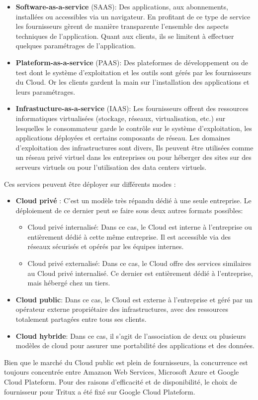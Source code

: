 \begin{itemize}
	\item   \textbf{Software-as-a-service} (SAAS): Des applications, aux abonnements, installées ou accessibles via un navigateur. En profitant de ce type de service les fournisseurs gèrent de manière transparente l'ensemble des aspects techniques de l'application. Quant aux clients, ils se limitent à effectuer quelques paramétrages de l'application. 
	\item \textbf{Plateform-as-a-service} (PAAS): Des plateformes de développement ou de test dont le système d'exploitation et les outils sont gérés par les fournisseurs du Cloud. Or les clients gardent la main sur l'installation des applications et leurs paramétrages.
	\item   \textbf{Infrastucture-as-a-service} (IAAS): Les fournisseurs offrent des ressources informatiques  virtualisées (stockage, réseaux, virtualisation, etc.) sur lesquelles le consommateur garde le contrôle sur le système d'exploitation, les applications déployées  et certains composants de réseau. 	Les domaines d'exploitation des infrastructures sont divers, Ils peuvent être  utilisées  comme un réseau privé virtuel dans les entreprises ou pour héberger des sites sur des serveurs virtuels ou pour l'utilisation des data centers virtuels. 
	
\end{itemize}
Ces services peuvent être déployer sur différents modes : \begin{itemize}
	\item \textbf{Cloud privé} : C'est un modèle très répandu dédié à une seule entreprise. Le déploiement de ce dernier peut se faire sous deux autres formats possibles:
	\begin{itemize}
		\item {Cloud privé internalisé}: Dans ce cas, le Cloud est interne à l'entreprise ou entièrement dédié à cette même entreprise. Il est accessible via des réseaux sécurisés et opérés par les équipes internes.
		\item {Cloud privé externalisé}: Dans ce cas, le Cloud offre des services similaires au Cloud privé internalisé. Ce dernier est entièrement dédié à l'entreprise, mais hébergé chez un tiers.
	\end{itemize}
	\item \textbf{Cloud public}: Dans ce cas, le Cloud est externe à l'entreprise et géré par un opérateur externe propriétaire des infrastructures, avec des ressources totalement partagées entre tous ses clients.
	\item \textbf{Cloud hybride}: Dans ce cas, il s'agit de l'association de deux ou plusieurs modèles de cloud pour assurer une portabilité des applications et des données.
\end{itemize}
Bien que le marché du Cloud public est plein de fournisseurs, la concurrence est toujours concentrée entre Amazaon Web Services, Microsoft Azure et Google Cloud Plateform. 
Pour des raisons d'efficacité et de disponibilité, le choix de fournisseur pour Tritux a été fixé sur Google Cloud Plateform.

